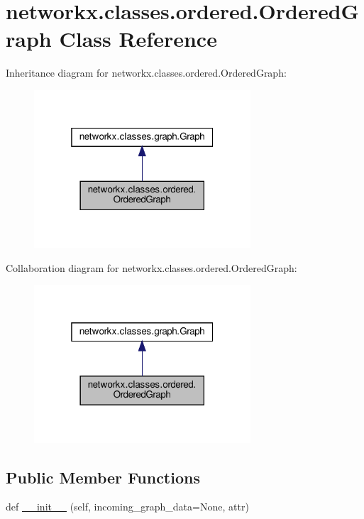 \hypertarget{classnetworkx_1_1classes_1_1ordered_1_1OrderedGraph}{}\section{networkx.\+classes.\+ordered.\+Ordered\+Graph Class Reference}
\label{classnetworkx_1_1classes_1_1ordered_1_1OrderedGraph}


Inheritance diagram for networkx.\+classes.\+ordered.\+Ordered\+Graph\+:
\nopagebreak
\begin{figure}[H]
\begin{center}
\leavevmode
\includegraphics[width=229pt]{classnetworkx_1_1classes_1_1ordered_1_1OrderedGraph__inherit__graph}
\end{center}
\end{figure}


Collaboration diagram for networkx.\+classes.\+ordered.\+Ordered\+Graph\+:
\nopagebreak
\begin{figure}[H]
\begin{center}
\leavevmode
\includegraphics[width=229pt]{classnetworkx_1_1classes_1_1ordered_1_1OrderedGraph__coll__graph}
\end{center}
\end{figure}
\subsection*{Public Member Functions}
\begin{DoxyCompactItemize}
\item 
def \hyperlink{classnetworkx_1_1classes_1_1ordered_1_1OrderedGraph_a9b1d1a9f7af2fb66b7b83f715aa79c75}{\+\_\+\+\_\+init\+\_\+\+\_\+} (self, incoming\+\_\+graph\+\_\+data=None, attr)
\end{DoxyCompactItemize}
